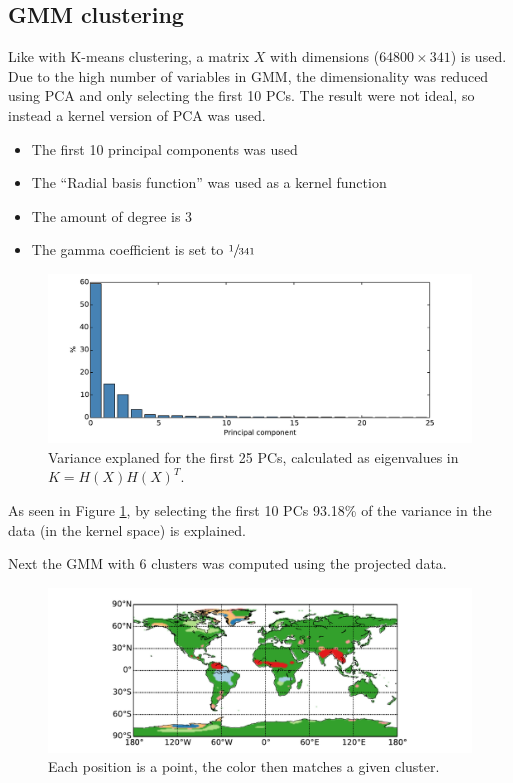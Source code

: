 \subsection{GMM clustering}
Like with K-means clustering, a matrix $X$ with dimensions ($64800 \times 341$) is used. Due to the high number of variables in GMM, the dimensionality was reduced using PCA and only selecting the first 10 PCs.
The result were not ideal, so instead a kernel version of PCA was used.

\begin{itemize}
\item The first 10 principal components was used
\item The ``Radial basis function'' was used as a kernel function
\item The amount of degree is 3
\item The gamma coefficient is set to $\sfrac{1}{341}$
\end{itemize}

\begin{figure}[H]
	\center
	\includegraphics[width=\textwidth]{figures/gmm-pca-explaned}
	\caption{Variance explaned for the first 25 PCs, calculated as eigenvalues in $K = H(X) H(X)^T$.}
	\label{fig:gmm-pca-explaned}
\end{figure}

As seen in Figure \ref{fig:gmm-pca-explaned}, by selecting the first 10 PCs 93.18\% of the variance in the data (in the kernel space) is explained.

Next the GMM with 6 clusters was computed using the projected data. 
\begin{figure}[H]
	\center
	\includegraphics[width=\textwidth]{figures/gmm-world}
	\caption{Each position is a point, the color then matches a given cluster.}
\end{figure}

